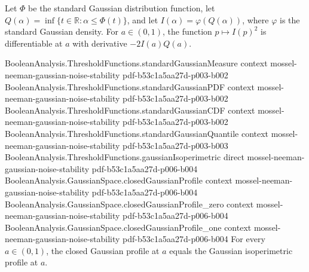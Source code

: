 \begin{lemma}
\leanok
{}
Let $\Phi$ be the standard Gaussian distribution function, let
$Q(\alpha)=\inf\{t\in\mathbb R: \alpha\leq\Phi(t)\}$, and let
$I(\alpha)=\varphi(Q(\alpha))$, where $\varphi$ is the standard Gaussian density. For
$a\in(0,1)$, the function $p\mapsto I(p)^2$ is differentiable at $a$ with derivative
$-2I(a)Q(a)$.
\end{lemma}

\begin{lemma}
\leanok
{}
\proofstep
  {BooleanAnalysis.ThresholdFunctions.standardGaussianMeasure}
  {context}
  {mossel-neeman-gaussian-noise-stability}
  {pdf-b53c1a5aa27d-p003-b002}
\proofstep
  {BooleanAnalysis.ThresholdFunctions.standardGaussianPDF}
  {context}
  {mossel-neeman-gaussian-noise-stability}
  {pdf-b53c1a5aa27d-p003-b002}
\proofstep
  {BooleanAnalysis.ThresholdFunctions.standardGaussianCDF}
  {context}
  {mossel-neeman-gaussian-noise-stability}
  {pdf-b53c1a5aa27d-p003-b002}
\proofstep
  {BooleanAnalysis.ThresholdFunctions.standardGaussianQuantile}
  {context}
  {mossel-neeman-gaussian-noise-stability}
  {pdf-b53c1a5aa27d-p003-b003}
\proofstep
  {BooleanAnalysis.ThresholdFunctions.gaussianIsoperimetric}
  {direct}
  {mossel-neeman-gaussian-noise-stability}
  {pdf-b53c1a5aa27d-p006-b004}
\proofstep
  {BooleanAnalysis.GaussianSpace.closedGaussianProfile}
  {context}
  {mossel-neeman-gaussian-noise-stability}
  {pdf-b53c1a5aa27d-p006-b004}
\proofstep
  {BooleanAnalysis.GaussianSpace.closedGaussianProfile_zero}
  {context}
  {mossel-neeman-gaussian-noise-stability}
  {pdf-b53c1a5aa27d-p006-b004}
\proofstep
  {BooleanAnalysis.GaussianSpace.closedGaussianProfile_one}
  {context}
  {mossel-neeman-gaussian-noise-stability}
  {pdf-b53c1a5aa27d-p006-b004}
For every $a\in(0,1)$, the closed Gaussian profile at $a$ equals the Gaussian
isoperimetric profile at $a$.
\end{lemma}


